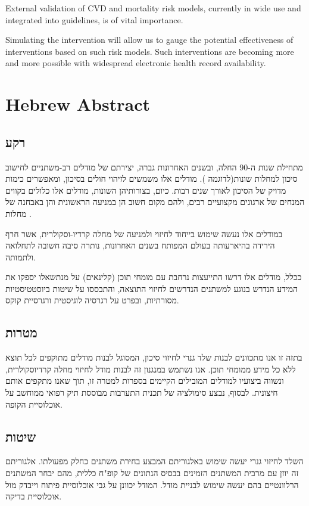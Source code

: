 \documentclass[a4paper,12pt]{article}
\begin{document}
		External validation of CVD and mortality risk models, currently in wide use and integrated into guidelines, is of vital importance\cite{Moons2012}.
		
		Simulating  the intervention will allow us to gauge the potential effectiveness of interventions based on such risk models. Such interventions are becoming more and more possible with widespread electronic health record availability.
		
	\section{Hebrew Abstract}
	
	\begin{hebrew}
		\subsection*{רקע}
				מתחילת שנות ה-90 החלה, ובשנים האחרונות גברה, יצירתם של מודלים רב-משתניים לחישוב סיכון למחלות שונות(לדוגמה \cite{Wilson1998,Conroy2003,DAgostino2008}). מודלים אלו משמשים לזיהוי חולים בסיכון, ומאפשרים כימות מדויק של הסיכון לאורך שנים רבות\cite{Goff2014}. כיום, בצורותיהן השונות, מודלים אלו כלולים בקווים המנחים של ארגונים מקצועיים רבים, ולהם מקום חשוב הן במניעה הראשונית והן באבחנה של מחלות \cite{Graham2007,Goff2014}.
				
				במודלים אלו נעשה שימוש בייחוד לחיזוי ולמניעה של מחלה קרדיו-וסקולרית, אשר חרף הירידה בהיארעותה בעולם המפותח בשנים האחרונות\cite{Koton2014,Vangen-Loenne2017}, נותרה סיבה חשובה לתחלואה ולתמותה\cite{ODonnell2016}.
				
				ככלל, מודלים אלו דרשו התייעצות נרחבת עם מומחי תוכן (קלינאים) על מנתשאלו יספקו את המידע הנדרש בנוגע למשתנים הנדרשים לחיזוי התוצאה, והתבססו על שיטות ביוסטטיסטיות מסורתיות, ובפרט על רגרסיה לוגיסטית ורגרסיית קוקס.
			
		\subsection*{מטרות}
				בתזה זו אנו מתכוונים לבנות שלד גנרי לחיזוי סיכון, המסוגל לבנות מודלים מתוקפים לכל תוצא ללא כל מידע ממומחי תוכן. אנו נשתמש במנגנון זה לבנות מודל לחיזוי מחלה קרדיוסקולרית, ונשווה ביצועיו למודלים המובילים הקיימים בספרות למטרה זו, תוך שאנו מתקפים אותם חיצונית. לבסוף, נבצע סימולציה של תכנית התערבות מבוססת תיק רפואי ממוחשב על אוכלוסיית הקופה.
		
		\subsection*{שיטות}
				השלד לחיזוי גנרי יעשה שימוש באלגוריתם המבצע בחירת משתנים כחלק מפעולתו. אלגוריתם זה יוזן עם מרבית המשתנים הזמינים בבסיס הנתונים של קופ"ח כללית, מהם יבחר המשתנים הרלוונטיים בהם יעשה שימוש לבניית מודל. המודל יכוונן על גבי אוכלוסיית פיתוח וייבדק מול אוכלוסיית בדיקה.
		

\end{hebrew}
\end{document}

